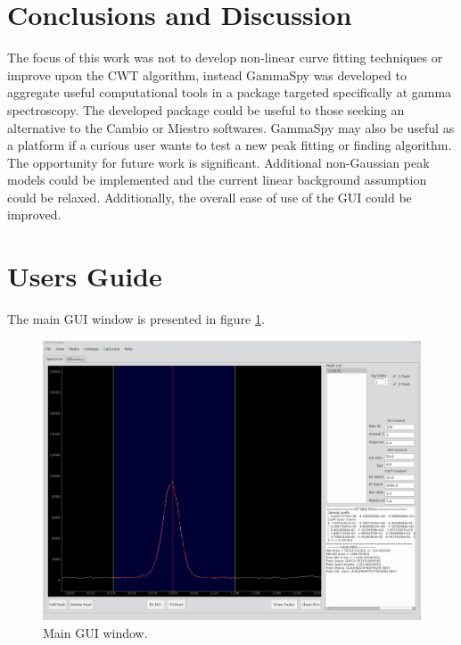 \documentclass[10pt]{article}
\begin{document}
\pagebreak
\section{Conclusions and Discussion}

The focus of this work was not to develop non-linear curve fitting techniques or improve upon the CWT algorithm,
instead GammaSpy was developed to aggregate useful computational tools in a package
targeted specifically at gamma spectroscopy. The developed package could be useful to those seeking
an alternative to the Cambio or Miestro softwares.  GammaSpy may also be useful as a platform if a curious user
wants to test a new peak fitting or finding algorithm.  The opportunity for
future work is significant.  Additional non-Gaussian peak models could be implemented and the
current linear background assumption could be relaxed.  Additionally, the overall ease of use of the
GUI could be improved.

\pagebreak
\section{Users Guide}
\label{ug}

The main GUI window is presented in figure \ref{gui}.
\begin{figure}[!htbp]
\centering
\includegraphics[width=14cm]{images/gui.png}
\caption{Main GUI window.}
\label{gui}
\end{figure}
\end{document}
